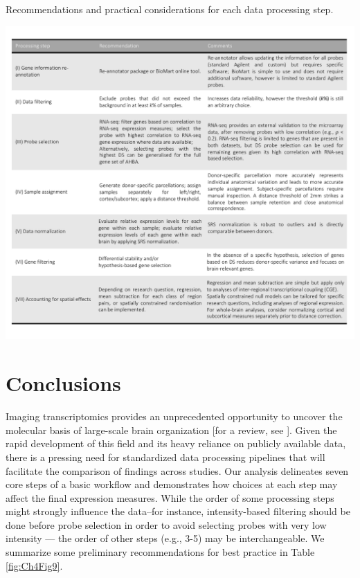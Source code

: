 \begin{table}[H]
\caption{Recommendations and practical considerations for each data processing step.}
  \centering
    \includegraphics[width=1\textwidth]{Chapter4/Ch4Fig9.pdf}
\label{fig:Ch4Fig9}
\end{table}

\section{Conclusions}

Imaging transcriptomics provides an unprecedented opportunity to uncover the molecular basis of large-scale brain organization [for a review, see \citep{Fornito2019}]. Given the rapid development of this field and its heavy reliance on publicly available data, there is a pressing need for standardized data processing pipelines that will facilitate the comparison of findings across studies. Our analysis delineates seven core steps of a basic workflow and demonstrates how choices at each step may affect the final expression measures. While the order of some processing steps might strongly influence the data--for instance, intensity-based filtering should be done before probe selection in order to avoid selecting probes with very low intensity — the order of other steps (e.g., 3-5) may be interchangeable. We summarize some preliminary recommendations for best practice in Table \ref{fig:Ch4Fig9}.

